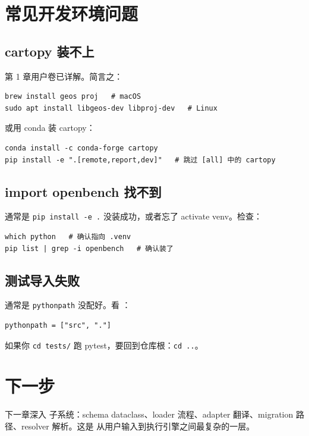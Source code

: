 \section{常见开发环境问题}

\subsection{cartopy 装不上}

第 1 章用户卷已详解。简言之：

\begin{verbatim}
brew install geos proj   # macOS
sudo apt install libgeos-dev libproj-dev   # Linux
\end{verbatim}

或用 conda 装 cartopy：

\begin{verbatim}
conda install -c conda-forge cartopy
pip install -e ".[remote,report,dev]"   # 跳过 [all] 中的 cartopy
\end{verbatim}

\subsection{import openbench 找不到}

通常是 \texttt{pip install -e .} 没装成功，或者忘了 activate venv。检查：

\begin{verbatim}
which python   # 确认指向 .venv
pip list | grep -i openbench   # 确认装了
\end{verbatim}

\subsection{测试导入失败}

通常是 \texttt{pythonpath} 没配好。看 ：

\begin{verbatim}
pythonpath = ["src", "."]
\end{verbatim}

如果你 \texttt{cd tests/} 跑 pytest，要回到仓库根：\texttt{cd ..}。

\section{下一步}

下一章深入  子系统：schema dataclass、loader 流程、adapter 翻译、migration 路径、resolver 解析。这是 \openbench{} 从用户输入到执行引擎之间最复杂的一层。
